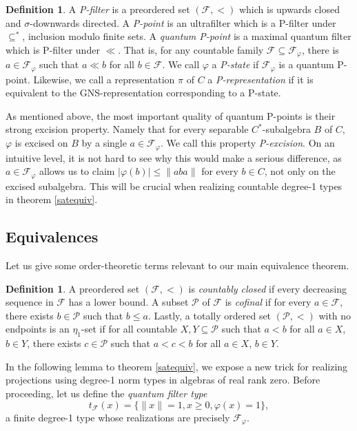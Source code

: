 \documentclass[10pt]{amsart}
\theoremstyle{definition}
\newtheorem{defn}[thm]{Definition}
\newcommand{\tF}{t_\mathscr{F}(x)}
\newcommand{\Fp}{\mathscr{F}_\varphi}
\begin{document}
\begin{defn}\label{Pstuff}
    A \textit{P-filter} is a preordered set $(\mathscr{F},<)$ which is upwards closed and $\sigma$-downwards directed. A \textit{P-point} is an ultrafilter which is a P-filter under $\subseteq^*$, inclusion modulo finite sets. A \textit{quantum P-point} is a maximal quantum filter which is P-filter under $\ll$. That is, for any countable family $\mathscr{F}\subseteq\Fp$, there is $a\in\Fp$ such that $a\ll b$ for all $b\in\mathscr{F}$. We call $\varphi$ a \textit{P-state} if $\Fp$ is a quantum P-point. Likewise, we call a representation $\pi$ of $C$ a \textit{P-representation} if it is equivalent to the GNS-representation corresponding to a P-state.
\end{defn}

As mentioned above, the most important quality of quantum P-points is their strong excision property. Namely that for every separable $C^*$-subalgebra $B$ of $C$, $\varphi$ is excised on $B$ by a single $a\in\mathscr{F}_\varphi$. We call this property \textit{P-excision}. On an intuitive level, it is not hard to see why this would make a serious difference, as $a\in\Fp$ allows us to claim $|\varphi(b)|\leq\|aba\|$ for every $b\in C$, not only on the excised subalgebra. This will be crucial when realizing countable degree-1 types in theorem \ref{satequiv}.

\subsection{Equivalences}

Let us give some order-theoretic terms relevant to our main equivalence theorem.

\begin{defn}\label{order}
    A preordered set $(\mathscr{F},<)$ is \textit{countably closed} if every decreasing sequence in $\mathscr{F}$ has a lower bound. A subset $\mathscr{P}$ of $\mathscr{F}$ is \textit{cofinal} if for every $a\in\mathscr{F}$, there exists $b\in\mathscr{P}$ such that $b\leq a$. Lastly, a totally ordered set $(\mathscr{P},<)$ with no endpoints is an $\eta_1$-set if for all countable $X,Y\subseteq\mathscr{P}$ such that $a<b$ for all $a\in X$, $b\in Y$, there exists $c\in\mathscr{P}$ such that $a<c<b$ for all $a\in X$, $b\in Y$.
\end{defn}

In the following lemma to theorem \ref{satequiv}, we expose a new trick for realizing projections using degree-1 norm types in algebras of real rank zero. Before proceeding, let us define the \textit{quantum filter type}
\[\tF=\{\|x\|=1,x\geq0,\varphi(x)=1\},\]
a finite degree-1 type whose realizations are precisely $\Fp$.
\end{document}
